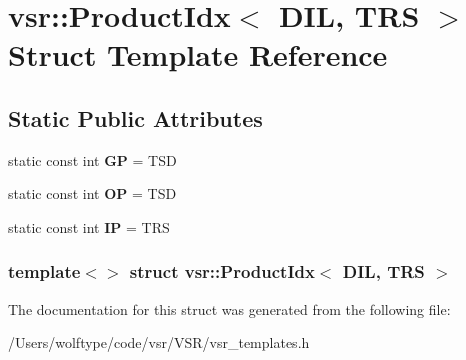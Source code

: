 \hypertarget{structvsr_1_1_product_idx_3_01_d_i_l_00_01_t_r_s_01_4}{\section{vsr\-:\-:Product\-Idx$<$ D\-I\-L, T\-R\-S $>$ Struct Template Reference}
\label{structvsr_1_1_product_idx_3_01_d_i_l_00_01_t_r_s_01_4}
}
\subsection*{Static Public Attributes}
\begin{DoxyCompactItemize}
\item 
\hypertarget{structvsr_1_1_product_idx_3_01_d_i_l_00_01_t_r_s_01_4_a3daa49fbb328271dda29bd0344d16a3e}{static const int {\bfseries G\-P} = T\-S\-D}\label{structvsr_1_1_product_idx_3_01_d_i_l_00_01_t_r_s_01_4_a3daa49fbb328271dda29bd0344d16a3e}

\item 
\hypertarget{structvsr_1_1_product_idx_3_01_d_i_l_00_01_t_r_s_01_4_a2ce57ca07bbf17c3a42b1ed24853f716}{static const int {\bfseries O\-P} = T\-S\-D}\label{structvsr_1_1_product_idx_3_01_d_i_l_00_01_t_r_s_01_4_a2ce57ca07bbf17c3a42b1ed24853f716}

\item 
\hypertarget{structvsr_1_1_product_idx_3_01_d_i_l_00_01_t_r_s_01_4_ad6791c5ab3d136927e0c1ac64ad48085}{static const int {\bfseries I\-P} = T\-R\-S}\label{structvsr_1_1_product_idx_3_01_d_i_l_00_01_t_r_s_01_4_ad6791c5ab3d136927e0c1ac64ad48085}

\end{DoxyCompactItemize}
\subsubsection*{template$<$$>$ struct vsr\-::\-Product\-Idx$<$ D\-I\-L, T\-R\-S $>$}



The documentation for this struct was generated from the following file\-:\begin{DoxyCompactItemize}
\item 
/\-Users/wolftype/code/vsr/\-V\-S\-R/vsr\-\_\-templates.\-h\end{DoxyCompactItemize}
